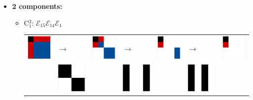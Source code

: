 \documentclass[11pt,dvipsnames]{article} %
\newcommand{\E}{\mathcal{E}}
\newcommand{\1}{\mathds{1}}
\begin{document}
\begin{itemize}
\item \textbf{2 components:}\newline
\begin{itemize}
\item C$_1^2$: $\E_{15}\E_{14}\E_1$\newline
\begin{tabular}{m{2cm} m{2cm} m{2cm} m{2cm} m{2cm} m{2cm} m{2cm}}
\includegraphics[width=2.2cm]{img-JA/id}  
& \hspace{0.8cm}$\longrightarrow$ 
& \includegraphics[width=2.2cm]{img-JA/8comp} 
& \hspace{0.8cm}$\longrightarrow$ 
& \includegraphics[width=2.2cm]{C43}
& \hspace{0.8cm}$\longrightarrow$ 
& \includegraphics[width=2.2cm]{C21}\\ 
 & \includegraphics[width=2.2cm]{img-JA/16To8} &  
 & \includegraphics[width=2.2cm]{semefue} &
 & \includegraphics[width=2.2cm]{ruleC81_2} &\\ 
\end{tabular} 


\end{itemize}
\end{itemize}
\end{document}
